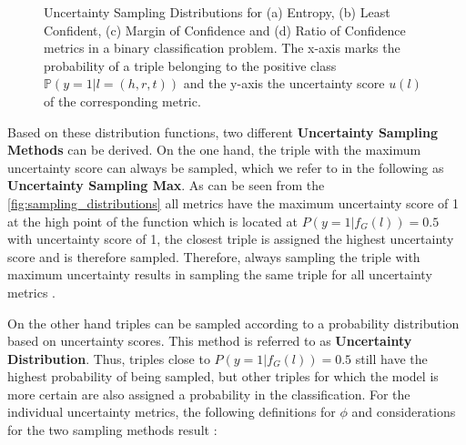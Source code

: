 \begin{figure}
\begin{minipage}{.5\textwidth}
    \end{minipage}%
    \caption{Uncertainty Sampling Distributions for (a) Entropy, (b) Least Confident, (c) Margin of Confidence and (d) Ratio of Confidence metrics in a binary classification problem.
    The x-axis marks the probability of a triple belonging to the positive class $\mathbb{P}(y = 1 | l = (h,r,t))$ and the y-axis the uncertainty score $u(l)$ of the corresponding metric.}
    \label{fig:sampling_distributions}
\end{figure}

Based on these distribution functions, two different \textbf{Uncertainty Sampling Methods} can be derived.
On the one hand, the triple with the maximum uncertainty score can always be sampled, which we refer to in the following as \textbf{Uncertainty Sampling Max}.
As can be seen from the \autoref{fig:sampling_distributions} all metrics have the maximum uncertainty score of 1 at the high point of the function which is located at $P(y = 1 | f_G(l)) = 0.5$ with uncertainty score of 1, the closest triple is assigned the highest uncertainty score and is therefore sampled.
Therefore, always sampling the triple with maximum uncertainty results in sampling the same triple for all uncertainty metrics \cite{nguyen2021howtomeasure, human-in-the-loop}.

On the other hand triples can be sampled according to a probability distribution based on uncertainty scores.
This method is referred to as \textbf{Uncertainty Distribution}.
Thus, triples close to $P(y = 1 | f_G(l)) = 0.5$ still have the highest probability of being sampled, but other triples for which the model is more certain are also assigned a probability in the classification.
For the individual uncertainty metrics, the following definitions for $\phi$ and considerations for the two sampling methods result \cite{human-in-the-loop}:

